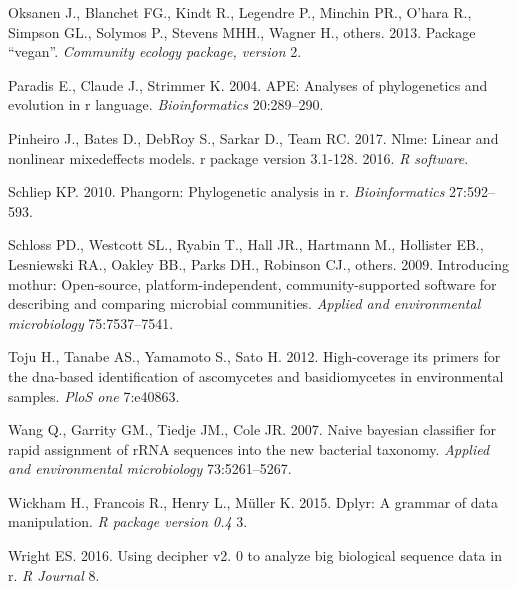 \documentclass[11pt,]{article}
\begin{document}
\hypertarget{ref-oksanen2013package}{}
Oksanen J., Blanchet FG., Kindt R., Legendre P., Minchin PR., O'hara R.,
Simpson GL., Solymos P., Stevens MHH., Wagner H., others. 2013. Package
``vegan''. \emph{Community ecology package, version} 2.

\hypertarget{ref-paradis2004ape}{}
Paradis E., Claude J., Strimmer K. 2004. APE: Analyses of phylogenetics
and evolution in r language. \emph{Bioinformatics} 20:289--290.

\hypertarget{ref-pinheiro2017nlme}{}
Pinheiro J., Bates D., DebRoy S., Sarkar D., Team RC. 2017. Nlme: Linear
and nonlinear mixedeffects models. r package version 3.1-128. 2016.
\emph{R software}.

\hypertarget{ref-schliep2010phangorn}{}
Schliep KP. 2010. Phangorn: Phylogenetic analysis in r.
\emph{Bioinformatics} 27:592--593.

\hypertarget{ref-schloss2009introducing}{}
Schloss PD., Westcott SL., Ryabin T., Hall JR., Hartmann M., Hollister
EB., Lesniewski RA., Oakley BB., Parks DH., Robinson CJ., others. 2009.
Introducing mothur: Open-source, platform-independent,
community-supported software for describing and comparing microbial
communities. \emph{Applied and environmental microbiology}
75:7537--7541.

\hypertarget{ref-toju2012high}{}
Toju H., Tanabe AS., Yamamoto S., Sato H. 2012. High-coverage its
primers for the dna-based identification of ascomycetes and
basidiomycetes in environmental samples. \emph{PloS one} 7:e40863.

\hypertarget{ref-wang2007naive}{}
Wang Q., Garrity GM., Tiedje JM., Cole JR. 2007. Naive bayesian
classifier for rapid assignment of rRNA sequences into the new bacterial
taxonomy. \emph{Applied and environmental microbiology} 73:5261--5267.

\hypertarget{ref-wickham2015dplyr}{}
Wickham H., Francois R., Henry L., Müller K. 2015. Dplyr: A grammar of
data manipulation. \emph{R package version 0.4} 3.

\hypertarget{ref-wright2016using}{}
Wright ES. 2016. Using decipher v2. 0 to analyze big biological sequence
data in r. \emph{R Journal} 8.




\end{document}
